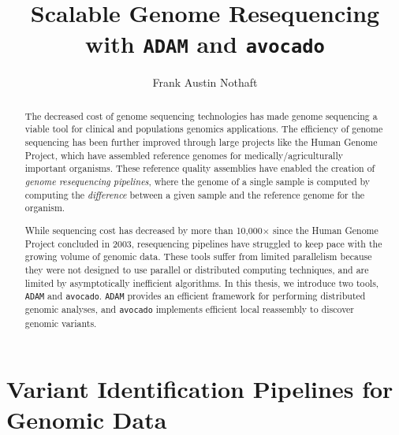 \documentclass[masters]{ucbthesis}
\begin{document}
\title{Scalable Genome Resequencing with \texttt{ADAM} and \texttt{avocado}}
\author{Frank Austin Nothaft}

\maketitle

\approvalpage
\copyrightpage

\begin{abstract}
The decreased cost of genome sequencing technologies has made genome sequencing a viable
tool for clinical and populations genomics applications. The efficiency of genome sequencing has
been further improved through large projects like the Human Genome Project, which have assembled
reference genomes for medically/agriculturally important organisms. These reference quality assemblies
have enabled the creation of \emph{genome resequencing pipelines}, where the genome of a single
sample is computed by computing the \emph{difference} between a given sample and the reference
genome for the organism.

While sequencing cost has decreased by more than 10,000$\times$ since the Human Genome Project
concluded in 2003, resequencing pipelines have struggled to keep pace with the growing volume of
genomic data. These tools suffer from limited parallelism because they were not designed to use parallel
or distributed computing techniques, and are limited by asymptotically inefficient algorithms. In this thesis,
we introduce two tools, \texttt{ADAM} and \texttt{avocado}. \texttt{ADAM} provides an efficient framework
for performing distributed genomic analyses, and \texttt{avocado} implements efficient local reassembly
to discover genomic variants.
\end{abstract}

\tableofcontents

\chapter{Variant Identification Pipelines for Genomic Data}
\end{document}
